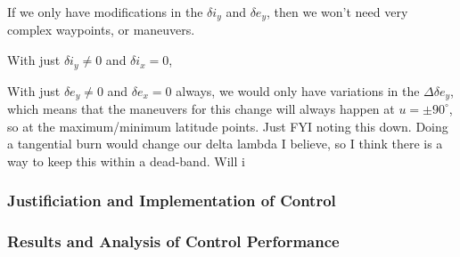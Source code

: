 If we only have modifications in the $\delta i_y$ and $\delta e_y$, then we won't need very complex waypoints, or maneuvers.

With just $\delta i_y \neq 0$ and $\delta i_x = 0$, 

With just $\delta e_y \neq 0$ and $\delta e_x = 0$ always, we would only have variations in the $\Delta \delta e_y$, which means that the maneuvers for this change will always happen at $u = \pm 90^\circ$, so at the maximum/minimum latitude points. Just FYI noting this down.
     Doing a tangential burn would change our delta lambda I believe, so I think there is a way to keep this within a dead-band.
     Will i 





\subsubsection{Justificiation and Implementation of Control}

\subsubsection{Results and Analysis of Control Performance}
